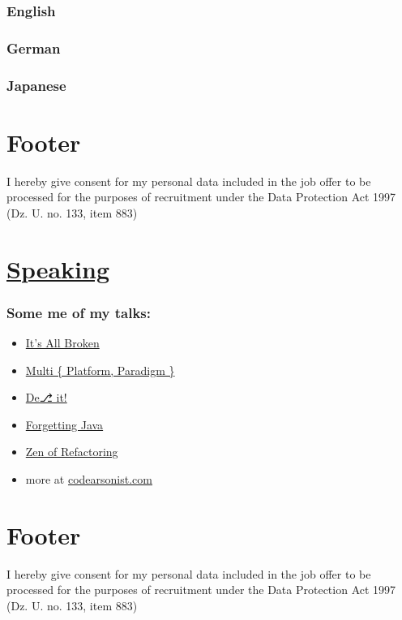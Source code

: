 \documentclass[11pt]{article}
\begin{document}
\subsubsection*{English}
\label{sec:org1673094}
\subsubsection*{German}
\label{sec:org69cdd23}
\subsubsection*{Japanese}
\label{sec:orgf6c7a9b}

\section*{Footer}
\label{sec:orge2b779d}
I hereby give consent for my personal data included in the job offer to be processed for the purposes of recruitment under the Data Protection Act 1997 (Dz. U. no. 133, item 883)
\section*{\href{https://codearsonist.com}{Speaking}}
\label{sec:org81e69d2}
\subsubsection*{Some me of my talks:}
\label{sec:orgfbf30ba}
\begin{itemize}
\item \href{https://codearsonist.com/talks/its-all-broken}{It's All Broken}
\item \href{https://codearsonist.com/talks/multi-platform-paradigm-programming}{Multi \{ Platform, Paradigm \}}
\item \href{https://codearsonist.com/talks/multi-platform-paradigm-programming}{De⎇ it!}
\item \href{https://codearsonist.com/talks/forgetting-java-why-java-should-die-in-flames-and-take-it-s-developers-along}{Forgetting Java}
\item \href{https://codearsonist.com/talks/forgetting-java-why-java-should-die-in-flames-and-take-it-s-developers-along}{Zen of Refactoring}
\item more at \href{https://codearsonist.com}{codearsonist.com}
\end{itemize}

\section*{Footer}
\label{sec:orgd48f99e}
I hereby give consent for my personal data included in the job offer to be processed for the purposes of recruitment under the Data Protection Act 1997 (Dz. U. no. 133, item 883)
\end{document}
